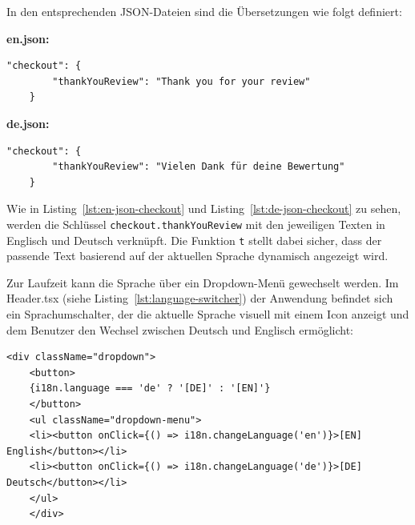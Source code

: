 \noindent In den entsprechenden JSON-Dateien sind die Übersetzungen wie folgt definiert:

\noindent \textbf{en.json:}
\begin{lstlisting}[style=pseudocode, caption={Englische Übersetzung in \texttt{en.json}}, label={lst:en-json-checkout}]
	"checkout": {
		"thankYouReview": "Thank you for your review"
	}
\end{lstlisting}

\noindent \textbf{de.json:}
\begin{lstlisting}[style=pseudocode, caption={Deutsche Übersetzung in \texttt{de.json}}, label={lst:de-json-checkout}]
	"checkout": {
		"thankYouReview": "Vielen Dank für deine Bewertung"
	}
\end{lstlisting}

\noindent Wie in Listing~\ref{lst:en-json-checkout} und Listing~\ref{lst:de-json-checkout} zu sehen, werden die Schlüssel \texttt{checkout.thankYouReview} mit den jeweiligen Texten in Englisch und Deutsch verknüpft. Die Funktion \texttt{t} stellt dabei sicher, dass der passende Text basierend auf der aktuellen Sprache dynamisch angezeigt wird.

\noindent Zur Laufzeit kann die Sprache über ein Dropdown-Menü gewechselt werden. Im Header.tsx  (siehe Listing~\ref{lst:language-switcher}) der Anwendung befindet sich ein Sprachumschalter, der die aktuelle Sprache visuell mit einem Icon anzeigt und dem Benutzer den Wechsel zwischen Deutsch und Englisch ermöglicht:

\begin{lstlisting}[style=pseudocode, caption={Sprachumschalter im Header}, label={lst:language-switcher}]
	<div className="dropdown">
	<button>
	{i18n.language === 'de' ? '[DE]' : '[EN]'}
	</button>
	<ul className="dropdown-menu">
	<li><button onClick={() => i18n.changeLanguage('en')}>[EN] English</button></li>
	<li><button onClick={() => i18n.changeLanguage('de')}>[DE] Deutsch</button></li>
	</ul>
	</div>
\end{lstlisting}


